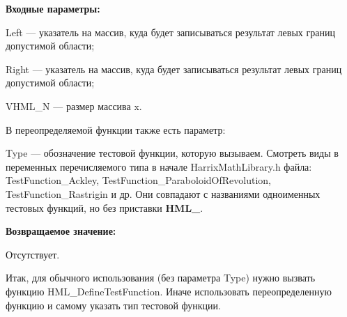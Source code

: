\textbf{Входные параметры:}

Left --- указатель на массив, куда будет записываться результат левых границ допустимой области;

Right --- указатель на массив, куда будет записываться результат левых границ допустимой области;
	 
VHML\_N --- размер массива x.

В переопределяемой функции также есть параметр:
  
Type --- обозначение тестовой функции, которую вызываем.
Смотреть виды в переменных перечисляемого типа в начале HarrixMathLibrary.h файла: TestFunction\_Ackley, TestFunction\_ParaboloidOfRevolution, TestFunction\_Rastrigin и др. Они совпадают с названиями одноименных тестовых функций, но без приставки \textbf{HML\_}.

\textbf{Возвращаемое значение:}
 
Отсутствует.

Итак, для обычного использования (без параметра Type) нужно вызвать функцию HML\_DefineTestFunction. Иначе использовать переопределенную функцию и самому указать тип тестовой функции.
